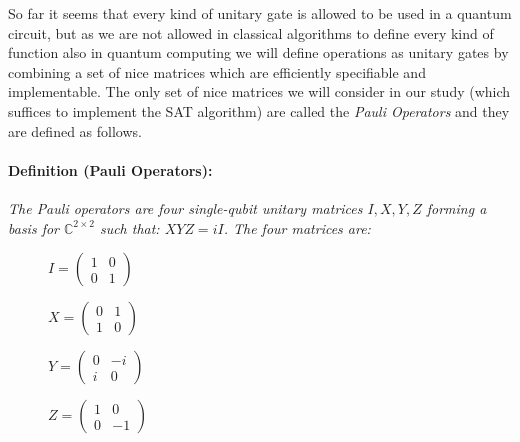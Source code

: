 \documentclass[english]{article}
\begin{document}
				So far it seems that every kind of unitary gate is allowed to be used in a quantum circuit, but as we are not allowed in classical algorithms to define every kind of function also in quantum computing we will define operations as unitary gates by combining a set of nice matrices which are efficiently specifiable and implementable. The only set of nice matrices we will consider in our study (which suffices to implement the SAT algorithm) are called the \emph{Pauli Operators} and they are defined as follows.
				
				\paragraph{Definition (Pauli Operators):} \emph{The Pauli operators are four single-qubit unitary matrices $I, X, Y, Z$ forming a basis for $\mathbb{C}^{2\times2}$ such that: $XYZ=iI$. The four matrices are:}
				\begin{figure}[h]
					\begin{minipage}{0.5\textwidth}
						\centering
						$
						I = \begin{pmatrix}
								1 & 0 \\
								0 & 1
						\end{pmatrix}
						$\vspace{0.2cm}
					\end{minipage}
					\begin{minipage}{0.5\textwidth}
						\centering
						$
						X = \begin{pmatrix}
								0 & 1 \\
								1 & 0
						\end{pmatrix}
						$\vspace{0.2cm}
					\end{minipage}
					\begin{minipage}{0.5\textwidth}
						\centering
						$
						Y = \begin{pmatrix}
								0 & -i \\
								i & 0
						\end{pmatrix}
						$
					\end{minipage}
					\begin{minipage}{0.5\textwidth}
						\centering
						$
						Z = \begin{pmatrix}
								1 & 0 \\
								0 & -1
						\end{pmatrix}
						$
					\end{minipage}
				\end{figure}
			
\end{document}
